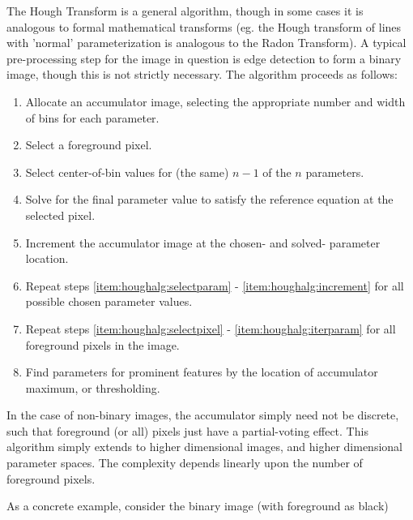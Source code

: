 The Hough Transform is a general algorithm, though in some cases it is analogous to formal mathematical transforms (eg. the Hough transform of lines with 'normal' parameterization is analogous to the Radon Transform). A typical pre-processing step for the image in question is edge detection to form a binary image, though this is not strictly necessary. The algorithm proceeds as follows:
\begin{enumerate}
	\item \label{item:houghalg:allocate} Allocate an accumulator image, selecting the appropriate number and width of bins for each parameter. 
	\item \label{item:houghalg:selectpixel} Select a foreground pixel.
	\item \label{item:houghalg:selectparam} Select center-of-bin values for (the same) $n-1$ of the $n$ parameters.
	\item \label{item:houghalg:solve} Solve for the final parameter value to satisfy the reference equation at the selected pixel.
	\item \label{item:houghalg:increment} Increment the accumulator image at the chosen- and solved- parameter location.
	\item \label{item:houghalg:iterparam} Repeat steps \ref{item:houghalg:selectparam} - \ref{item:houghalg:increment} for all possible chosen parameter values.
	\item \label{item:houghalg:iterpixel} Repeat steps \ref{item:houghalg:selectpixel} - \ref{item:houghalg:iterparam} for all foreground pixels in the image.
	\item \label{item:houghalg:findfeatures} Find parameters for prominent features by the location of accumulator maximum, or thresholding.
\end{enumerate}
In the case of non-binary images, the accumulator simply need not be discrete, such that foreground (or all) pixels just have a partial-voting effect. This algorithm simply extends to higher dimensional images, and higher dimensional parameter spaces. The complexity depends linearly upon the number of foreground pixels. 

As a concrete example, consider the binary image (with foreground as black)
\begin{center}
\end{center}

